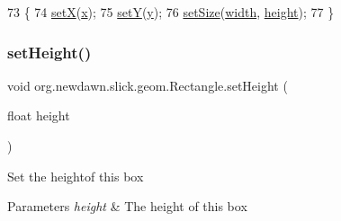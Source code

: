 \begin{DoxyCode}
73                                                                        \{
74         \mbox{\hyperlink{classorg_1_1newdawn_1_1slick_1_1geom_1_1_shape_a1469b8ef682642c4257869640c27bf16}{setX}}(\mbox{\hyperlink{classorg_1_1newdawn_1_1slick_1_1geom_1_1_shape_a3e985bfff386c15a4efaad03d8ad60d3}{x}});
75         \mbox{\hyperlink{classorg_1_1newdawn_1_1slick_1_1geom_1_1_shape_a7a127d0dea9bd7f0e3ce3fd0a61268fc}{setY}}(\mbox{\hyperlink{classorg_1_1newdawn_1_1slick_1_1geom_1_1_shape_a9f934baded6a1b65ebb69e7e5f80ea00}{y}});
76         \mbox{\hyperlink{classorg_1_1newdawn_1_1slick_1_1geom_1_1_rectangle_a5ca68ddf9ea2e1bf7848c0bc4d140ee2}{setSize}}(\mbox{\hyperlink{classorg_1_1newdawn_1_1slick_1_1geom_1_1_rectangle_a967e1823f62daf45abb142779d1be62d}{width}}, \mbox{\hyperlink{classorg_1_1newdawn_1_1slick_1_1geom_1_1_rectangle_a3bd010fdce636fc11ed0e0ad4d4b4a0a}{height}});
77     \}
\end{DoxyCode}
\mbox{\label{classorg_1_1newdawn_1_1slick_1_1geom_1_1_rectangle_a0f92d7c72369d28e09ae194b04119e26}} 
\subsubsection{\texorpdfstring{set\+Height()}{setHeight()}}
{\footnotesize\ttfamily void org.\+newdawn.\+slick.\+geom.\+Rectangle.\+set\+Height (\begin{DoxyParamCaption}\item[{float}]{height }\end{DoxyParamCaption})\hspace{0.3cm}{\ttfamily [inline]}}

Set the heightof this box


\begin{DoxyParams}{Parameters}
{\em height} & The height of this box \\
\hline
\end{DoxyParams}

